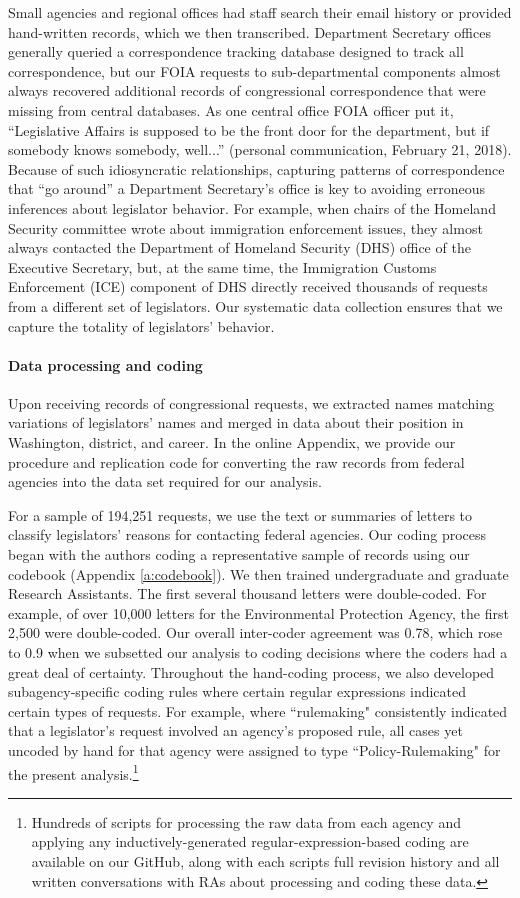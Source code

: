 \documentclass[12pt]{article}
\begin{document}
Small agencies and regional offices had staff search their email history or provided hand-written records, which we then transcribed. Department Secretary offices generally queried a correspondence tracking database designed to track all correspondence, but our FOIA requests to sub-departmental components almost always recovered additional records of congressional correspondence that were missing from central databases. As one central office FOIA officer put it, ``Legislative Affairs is supposed to be the front door for the department, but if somebody knows somebody, well...'' (personal communication, February 21, 2018). Because of such idiosyncratic relationships, capturing patterns of correspondence that ``go around'' a Department Secretary's office is key to avoiding erroneous inferences about legislator behavior. For example, when chairs of the Homeland Security committee wrote about immigration enforcement issues, they almost always contacted the Department of Homeland Security (DHS) office of the Executive Secretary, but, at the same time, the Immigration Customs Enforcement (ICE) component of DHS directly received thousands of requests from a different set of legislators. Our systematic data collection ensures that we capture the totality of legislators' behavior. 

\paragraph{Data processing and coding} Upon receiving records of congressional requests, we extracted names matching variations of legislators' names and merged in data about their position in Washington, district, and career. In the online Appendix, we provide our procedure and replication code for converting the raw records from federal agencies into the data set required for our analysis. 

For a sample of 194,251 requests, we use the text or summaries of letters to classify legislators' reasons for contacting federal agencies.  Our coding process began with the authors coding a representative sample of records using our codebook (Appendix \ref{a:codebook}). We then trained undergraduate and graduate Research Assistants. The first several thousand letters were double-coded. For example, of over 10,000 letters for the Environmental Protection Agency, the first 2,500 were double-coded. Our overall inter-coder agreement was 0.78, which rose to 0.9 when we subsetted our analysis to coding decisions where the coders had a great deal of certainty. Throughout the hand-coding process, we also developed subagency-specific coding rules where certain regular expressions indicated certain types of requests. For example, where ``rulemaking" consistently indicated that a legislator's request involved an agency's proposed rule, all cases yet uncoded by hand for that agency were assigned to type ``Policy-Rulemaking" for the present analysis.\footnote{Hundreds of scripts for processing the raw data from each agency and applying any inductively-generated regular-expression-based coding are available on our GitHub, along with each scripts full revision history and all written conversations with RAs about processing and coding these data.}   
\end{document}

